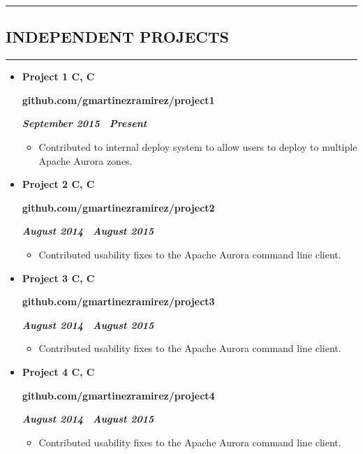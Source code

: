 \documentclass[10pt,letterpaper]{article}
\newcommand{\textbox}[1]{
  \parbox{.333\textwidth}{#1}
}
\newcommand{\CPP}
{C\nolinebreak[4]\hspace{-.05em}\raisebox{.22ex}{\footnotesize\bf ++}}
\newcommand{\sectionTitle}[1]{
  \hrule
  \vspace{-1.0em} 
  \subsection*{\uppercase{\textbf{#1}}}
  \vspace{-0.3em}
    \hrule
    \vspace{0.3em}  
}
\newcommand{\titleExperienceWithoutLocation}[4]{
  \vspace{1.0em}
  \item[]
  {
    \textbox{\textbf{#1}\hfill}\textbox{\hfil \textbf{#2}\hfil}\hfill \textbf{\emph{#3 \textendash \ #4}}
  }
}
\begin{document}
  \sectionTitle{Independent Projects}
  \vspace{-0.9em}
  \begin{itemize}
    \parskip=-0.6em 
    \titleExperienceWithoutLocation{Project 1 \quad C, \CPP}{github.com/gmartinezramirez/project1}{September 2015}{Present}
      \begin{itemize}[label=\textbullet]
        \itemsep0em
        \item Contributed to internal deploy system to allow users to deploy to multiple Apache Aurora zones.
      \end{itemize}
  
    \vspace{-0.6em} 
    \titleExperienceWithoutLocation{Project 2 \quad C, \CPP}{github.com/gmartinezramirez/project2}{August 2014}{August 2015}
      \begin{itemize}[label=\textbullet]
        \itemsep0em
        \item Contributed usability fixes to the Apache Aurora command line client.
      \end{itemize}

    \vspace{-0.6em} 
    \titleExperienceWithoutLocation{Project 3 \quad C, \CPP}{github.com/gmartinezramirez/project3}{August 2014}{August 2015}
      \begin{itemize}[label=\textbullet]
        \itemsep0em
        \item Contributed usability fixes to the Apache Aurora command line client.
      \end{itemize}
    \vspace{-0.6em} 
    \titleExperienceWithoutLocation{Project 4 \quad C, \CPP}{github.com/gmartinezramirez/project4}{August 2014}{August 2015}
    \begin{itemize}[label=\textbullet]
      \itemsep0em
      \item Contributed usability fixes to the Apache Aurora command line client.
    \end{itemize}
  \end{itemize}
\end{document}
